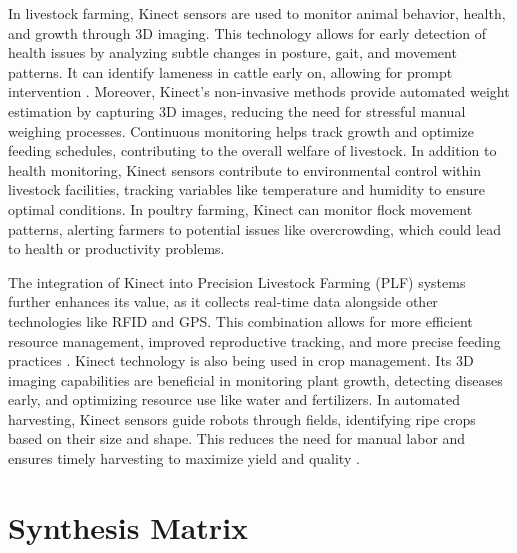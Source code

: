 {In livestock farming, Kinect sensors are used to monitor animal behavior, health, and growth through 3D imaging. This technology allows for early detection of health issues by analyzing subtle changes in posture, gait, and movement patterns. It can identify lameness in cattle early on, allowing for prompt intervention \citep{singh2022smart}. Moreover, Kinect’s non-invasive methods provide automated weight estimation by capturing 3D images, reducing the need for stressful manual weighing processes. Continuous monitoring helps track growth and optimize feeding schedules, contributing to the overall welfare of livestock. In addition to health monitoring, Kinect sensors contribute to environmental control within livestock facilities, tracking variables like temperature and humidity to ensure optimal conditions. In poultry farming, Kinect can monitor flock movement patterns, alerting farmers to potential issues like overcrowding, which could lead to health or productivity problems.

The integration of Kinect into Precision Livestock Farming (PLF) systems further enhances its value, as it collects real-time data alongside other technologies like RFID and GPS. This combination allows for more efficient resource management, improved reproductive tracking, and more precise feeding practices \citep{monteiro2021precision}. Kinect technology is also being used in crop management. Its 3D imaging capabilities are beneficial in monitoring plant growth, detecting diseases early, and optimizing resource use like water and fertilizers. In automated harvesting, Kinect sensors guide robots through fields, identifying ripe crops based on their size and shape. This reduces the need for manual labor and ensures timely harvesting to maximize yield and quality \citep{singh2022smart}.

\section{Synthesis Matrix}

}
